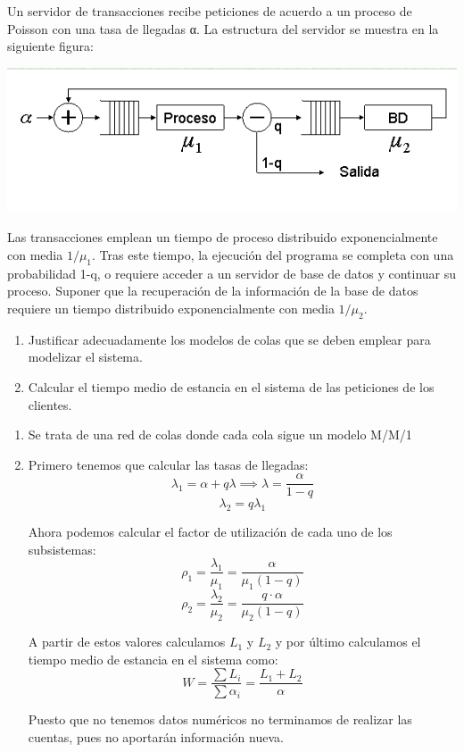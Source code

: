 \begin{problem}[15]\label{tema2:prob15}
Un servidor de transacciones recibe peticiones de acuerdo a un proceso de Poisson con una tasa de llegadas α. La estructura del servidor se muestra en la siguiente figura:

\begin{center}
  \includegraphics[keepaspectratio=true,width=\linewidth]{img/ej15.png}
\end{center}

Las transacciones emplean un tiempo de proceso distribuido exponencialmente con media $1/μ_1$. Tras este tiempo, la ejecución del programa se completa con una probabilidad 1-q, o requiere acceder a un servidor de base de datos y continuar su proceso. Suponer que la recuperación de la información de la base de datos requiere un tiempo distribuido exponencialmente con media $1/μ_2$.
\begin{enumerate}
\item Justificar adecuadamente los modelos de colas que se deben emplear para modelizar el sistema.
\item Calcular el tiempo medio de estancia en el sistema de las peticiones de los clientes.
\end{enumerate}
\solution

\begin{enumerate}
\item Se trata de una red de colas donde cada cola sigue un modelo M/M/1

\item

Primero tenemos que calcular las tasas de llegadas:
\[λ_1 = α+qλ \implies λ = \frac{α}{1-q}\]
\[λ_2 = q λ_1\]

Ahora podemos calcular el factor de utilización de cada uno de los subsistemas:
\[ρ_1 = \frac{λ_1}{μ_1} = \frac{α}{μ_1(1-q)}\]
\[ρ_2 = \frac{λ_2}{μ_2} = \frac{q\cdot α}{μ_2(1-q)}\]

A partir de estos valores calculamos $L_1$ y $L_2$ y por último calculamos el tiempo medio de estancia en el sistema como:
\[W = \frac{\sum L_i}{\sum α_i}=\frac{L_1+L_2}{α}\]

Puesto que no tenemos datos numéricos no terminamos de realizar las cuentas, pues no aportarán información nueva.
\end{enumerate}

\end{problem}

